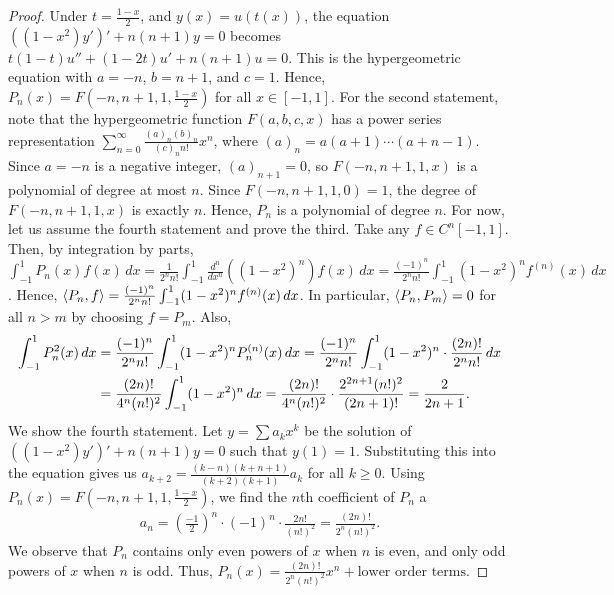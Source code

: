 \begin{proof}
    Under $t = \frac{1-x}{2}$, and $y(x) = u(t(x))$, the equation $((1-x^{2})y')' + n(n+1) y = 0$ becomes $t(1-t) u'' + (1-2t) u' + n(n+1) u = 0$. This is the hypergeometric equation with $a = -n$, $b = n+1$, and $c = 1$. Hence, $P_{n}(x) = F(-n,n+1,1,\frac{1-x}{2})$ for all $x \in [-1,1]$. For the second statement, note that the hypergeometric function $F(a,b,c,x)$ has a power series representation $\sum_{n=0}^{\infty} \frac{(a)_{n} (b)_{n}}{(c)_{n} n!} x^{n}$, where $(a)_{n} = a(a+1)\cdots(a+n-1)$. Since $a = -n$ is a negative integer, $(a)_{n+1} = 0$, so $F(-n,n+1,1,x)$ is a polynomial of degree at most $n$. Since $F(-n,n+1,1,0) = 1$, the degree of $F(-n,n+1,1,x)$ is exactly $n$. Hence, $P_{n}$ is a polynomial of degree $n$. For now, let us assume the fourth statement and prove the third. Take any $f \in C^{n}[-1,1]$. Then, by integration by parts, $\int_{-1}^{1} P_{n}(x) f(x) \, dx = \frac{1}{2^{n} n!} \int_{-1}^{1} \frac{d^{n}}{dx^{n}} ((1-x^{2})^{n}) f(x) \, dx = \frac{(-1)^{n}}{2^{n} n!} \int_{-1}^{1} (1-x^{2})^{n} f^{(n)}(x) \, dx$. Hence, $\langle P_{n},f\rangle = \frac{(-1)^{n}}{2^{n} n!} \int_{-1}^{1} (1-x^{2})^{n} f^{(n)}(x) \, dx$. In particular, $\langle P_{n},P_{m}\rangle = 0$ for all $n > m$ by choosing $f = P_{m}$. Also,
    \begin{align}
        \int_{-1}^{1} P_{n}^{2}(x) \, dx &= \frac{(-1)^{n}}{2^{n} n!} \int_{-1}^{1} (1-x^{2})^{n} P_{n}^{(n)}(x) \, dx = \frac{(-1)^{n}}{2^{n} n!} \int_{-1}^{1} (1-x^{2})^{n} \cdot \frac{(2n)!}{2^{n} n!} \, dx \notag \\ &= \frac{(2n)!}{4^{n} (n!)^{2}} \int_{-1}^{1} (1-x^{2})^{n} \, dx = \frac{(2n)!}{4^{n} (n!)^{2}} \cdot \frac{2^{2n+1} (n!)^{2}}{(2n+1)!} = \frac{2}{2n+1}.
    \end{align}
    We show the fourth statement. Let $y = \sum a_{k} x^{k}$ be the solution of $((1-x^{2})y')' + n(n+1) y = 0$ such that $y(1) = 1$. Substituting this into the equation gives us $a_{k+2} = \frac{(k-n)(k+n+1)}{(k+2)(k+1)} a_{k}$ for all $k \geq 0$. Using $P_{n}(x) = F(-n,n+1,1,\frac{1-x}{2})$, we find the $n$th coefficient of $P_{n}$ a
    \begin{align}
        a_{n} = \left( \frac{-1}{2} \right)^{n} \cdot (-1)^{n} \cdot \frac{2n!}{(n!)^{2}} = \frac{(2n)!}{2^{n} (n!)^{2}}.
    \end{align}
    We observe that $P_{n}$ contains only even powers of $x$ when $n$ is even, and only odd powers of $x$ when $n$ is odd. 
Thus, $P_n(x) = \frac{(2n)!}{2^n (n!)^2} x^n + \text{lower order terms}$.


\end{proof}
